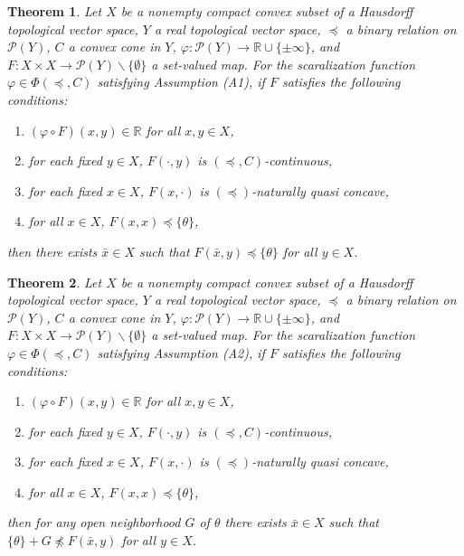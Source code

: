 \documentclass[a4paper,11pt]{jsarticle}
\newtheorem{thm}{Theorem}[section]
\theoremstyle{definition}
\newcommand{\RealNumberSet}{\mathbb{R}}
\begin{document}
\begin{thm}
  Let $X$ be a nonempty compact convex subset of a Hausdorff topological vector space,
  $Y$ a real topological vector space, $\preccurlyeq$ a binary relation on $\mathcal{P}(Y)$,
  $C$ a convex cone in $Y$, $\varphi\colon \mathcal{P}(Y) \to \RealNumberSet \cup \{\pm \infty\}$,
  and $F\colon X \times X \to \mathcal{P}(Y) \backslash \{\emptyset\}$ a set-valued map.
  For the scaralization function $\varphi \in \Phi(\preccurlyeq, C)$ satisfying Assumption (A1),
  if $F$ satisfies the following conditions:
  \begin{enumerate}
    \item $(\varphi \circ F)(x,y) \in \RealNumberSet$ for all $x,y \in X$,
    \item for each fixed $y \in X$, $F(\cdot,y)$ is $(\preccurlyeq, C)$-continuous,
    \item for each fixed $x \in X$, $F(x,\cdot)$ is $(\preccurlyeq)$-naturally quasi concave,
    \item for all $x \in X$, $F(x,x) \preccurlyeq \{\theta\}$,
  \end{enumerate}
  then there exists $\bar{x} \in X$ such that $ F(\bar{x},y) \preccurlyeq \{\theta\} $ for all $y \in X$.
\end{thm}

\begin{thm}
  Let $X$ be a nonempty compact convex subset of a Hausdorff topological vector space,
  $Y$ a real topological vector space, $\preccurlyeq$ a binary relation on $\mathcal{P}(Y)$,
  $C$ a convex cone in $Y$, $\varphi\colon \mathcal{P}(Y) \to \RealNumberSet \cup \{\pm \infty\}$,
  and $F\colon X \times X \to \mathcal{P}(Y) \backslash \{\emptyset\}$ a set-valued map.
  For the scaralization function $\varphi \in \Phi(\preccurlyeq, C)$ satisfying Assumption (A2),
  if $F$ satisfies the following conditions:
  \begin{enumerate}
    \item $(\varphi \circ F)(x,y) \in \RealNumberSet$ for all $x,y \in X$,
    \item for each fixed $y \in X$, $F(\cdot,y)$ is $(\preccurlyeq, C)$-continuous,
    \item for each fixed $x \in X$, $F(x,\cdot)$ is $(\preccurlyeq)$-naturally quasi concave,
    \item for all $x \in X$, $F(x,x) \preccurlyeq \{\theta\}$,
  \end{enumerate}
  then for any open neighborhood $G$ of $\theta$ there exists $\bar{x} \in X$ such that $\{\theta\} + G \npreccurlyeq F(\bar{x},y)$
  for all $y \in X$.
\end{thm}
\end{document}

